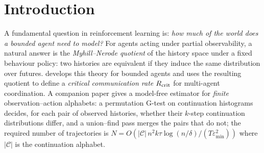 \documentclass[10pt]{article}
\newcommand{\calC}{\mathcal{C}}
\newcommand{\epsmin}{\varepsilon_{\min}}
\begin{document}
\begin{abstract}
Empirically, the procedure we run (permutation test with BH; procedure P) returns
the latent index on 90/90 runs when $B=n$ on Tiger, K-cycle ($K\le16$) and a
Gaussian-mixture walk, but this uses $n$: with $B$ chosen without $n$ the
adjusted Rand index drops on K-cycle ($K\ge4$) and the index is over-split. No
baseline we implement (RKHS $\varepsilon$-machine, GRU causal-state learning,
Ferns bisimulation metric, multivariate Wasserstein, DBC) is uniformly better or
worse; the GRU is strongest on K-cycle. The analysed variant (T) of Theorem~1 is
conservative: with the sampler its theorem covers (one window per trajectory) it merges
Tiger's classes at $N{=}3000$, resolving them from $N{=}10^4$ at $B{=}2$, and merges
all Gaussian-mixture classes at $N\le3000$. We state which guarantee covers which procedure. On PO-MuJoCo the
estimator returns $\hat n{=}B$, and a trajectory-level held-out analysis shows the
classes carry no information beyond a nonlinear function of speed. On a 4-state
chain Dec-POMDP the estimated critical communication rate tracks the analytical
value within $0.8\%$ mean error when both quotients are non-trivial; on Dec-Tiger
agent A over-splits on 5/10 seeds at $\alpha{=}0.05$. We report all seeds. Code
and results: github.com/npow/quotient-learning-papers (\texttt{cql/}, tag
\texttt{v1}, commit \texttt{83f9f42}; new result files in commit \texttt{2c16829}).
\end{abstract}

\section{Introduction}

A fundamental question in reinforcement learning is: \emph{how much of the
world does a bounded agent need to model?}  For agents acting under partial
observability, a natural answer is the \emph{Myhill--Nerode quotient} of the
history space under a fixed behaviour policy: two histories are equivalent if
they induce the same distribution over futures.  \citet{nixon2026quotient}
develops this theory for bounded agents and \citet{nixon2026rcrit} uses the
resulting quotient to define a \emph{critical communication rate}
$R_{\rm crit}$ for multi-agent coordination.  A companion paper
\citep{Companion2026} gives a model-free estimator for \emph{finite}
observation--action alphabets: a permutation G-test on continuation histograms
decides, for each pair of observed histories, whether their $k$-step
continuation distributions differ, and a union--find pass merges the pairs that
do not; the required number of trajectories is
$N=O(|\calC|\,n^2k\tau\log(n/\delta)/(T\epsmin^2))$ where $|\calC|$ is the
continuation alphabet.
\end{document}
